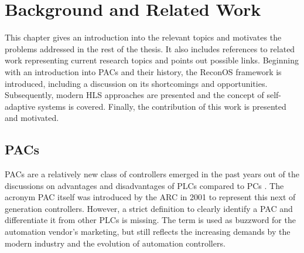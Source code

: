 \chapter{Background and Related Work}
\label{chap:motivation}
This chapter gives an introduction into the relevant topics and motivates
the problems addressed in the rest of the thesis. It also includes
references to related work representing current research topics and points out
possible links. Beginning with an introduction into \acp{PAC} and their
history, the ReconOS framework is introduced, including a discussion on its
shortcomings and opportunities. Subsequently, modern \ac{HLS} approaches are
presented and the concept of self-adaptive systems is covered. Finally, the
contribution of this work is presented and motivated.

\section{\aclp{PAC}}
\aclp{PAC} are a relatively new class of controllers emerged in the past years
out of the discussions on advantages and disadvantages of \acp{PLC} compared
to \acp{PC} \citep{bel05}. The acronym \ac{PAC} itself was introduced by the
\ac{ARC} in 2001 \citep{pay13} to represent this next of generation
controllers. However, a strict definition to clearly identify a \ac{PAC} and
differentiate it from other \acp{PLC} is missing. The term is used as buzzword
for the automation vendor's marketing, but still reflects the increasing
demands by the modern industry and the evolution of automation controllers.

